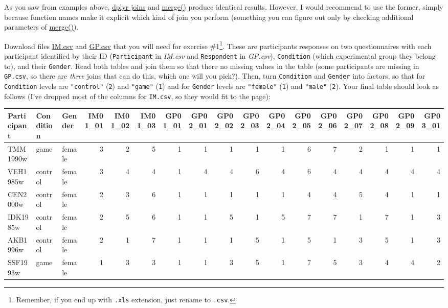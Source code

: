 \documentclass[
]{book}
\begin{document}
As you saw from examples above, \href{https://dplyr.tidyverse.org/reference/mutate-joins.html}{dplyr joins} and \href{https://stat.ethz.ch/R-manual/R-devel/library/base/html/merge.html}{merge()} produce identical results. However, I would recommend to use the former, simply because function names make it explicit which kind of join you perform (something you can figure out only by checking additional parameters of \href{https://stat.ethz.ch/R-manual/R-devel/library/base/html/merge.html}{merge()}).

Download files \href{data/IM.csv}{IM.csv} and \href{data/GP.csv}{GP.csv} that you will need for exercise \#1\footnote{Remember, if you end up with \texttt{.xls} extension, just rename to \texttt{.csv}.}. These are participants responses on two questionnaires with each participant identified by their ID (\texttt{Participant} in \emph{IM.csv} and \texttt{Respondent} in \emph{GP.csv}), \texttt{Condition} (which experimental group they belong to), and their \texttt{Gender}. Read both tables and join them so that there no missing values in the table (some participants are missing in \texttt{GP.csv}, so there are \emph{three} joins that can do this, which one will you pick?). Then, turn \texttt{Condition} and \texttt{Gender} into factors, so that for \texttt{Condition} levels are \texttt{"control"} (\texttt{2}) and \texttt{"game"} (\texttt{1}) and for \texttt{Gender} levels are \texttt{"female"} (\texttt{1}) and \texttt{"male"} (\texttt{2}). Your final table should look as follows (I've dropped most of the columns for \texttt{IM.csv}, so they would fit to the page):

\begin{tabular}{l|l|l|r|r|r|r|r|r|r|r|r|r|r|r|r|r}
\hline
Participant & Condition & Gender & IM01\_01 & IM01\_02 & IM01\_03 & GP01\_01 & GP02\_01 & GP02\_02 & GP02\_03 & GP02\_04 & GP02\_05 & GP02\_06 & GP02\_07 & GP02\_08 & GP02\_09 & GP03\_01\\
\hline
TMM1990w & game & female & 3 & 2 & 5 & 1 & 1 & 1 & 1 & 1 & 6 & 7 & 2 & 1 & 1 & 1\\
\hline
VEH1985w & control & female & 3 & 4 & 4 & 1 & 4 & 4 & 6 & 4 & 6 & 4 & 4 & 4 & 4 & 4\\
\hline
CEN2000w & control & female & 2 & 3 & 6 & 1 & 1 & 1 & 1 & 1 & 4 & 4 & 5 & 4 & 1 & 1\\
\hline
IDK1985w & control & female & 2 & 5 & 6 & 1 & 1 & 5 & 1 & 5 & 7 & 7 & 1 & 7 & 1 & 3\\
\hline
AKB1996w & control & female & 2 & 1 & 7 & 1 & 1 & 1 & 5 & 1 & 5 & 1 & 3 & 5 & 1 & 3\\
\hline
SSF1993w & game & female & 1 & 3 & 3 & 1 & 1 & 3 & 5 & 1 & 7 & 5 & 3 & 4 & 4 & 2\\
\hline
\end{tabular}
\end{document}
